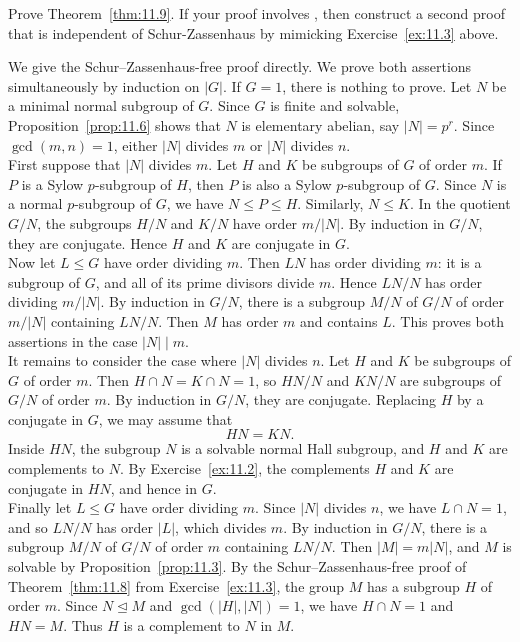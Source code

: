 \documentclass[../Odyssey_Project.tex]{subfiles}
\begin{document}
\begin{exercise}
\label{ex:11.4}
Prove Theorem~\ref{thm:11.9}. If your proof involves , then construct a second proof that is independent of Schur-Zassenhaus by mimicking Exercise~\ref{ex:11.3} above.
\end{exercise}
\begin{solution}
    We give the Schur--Zassenhaus-free proof directly. We prove both assertions simultaneously by induction on $\lvert G\rvert$. If $G=1$, there is nothing to prove. Let $N$ be a minimal normal subgroup of $G$. Since $G$ is finite and solvable, Proposition~\ref{prop:11.6} shows that $N$ is elementary abelian, say $\lvert N\rvert=p^r$. Since $\gcd(m,n)=1$, either $\lvert N\rvert$ divides $m$ or $\lvert N\rvert$ divides $n$.\\
    First suppose that $\lvert N\rvert$ divides $m$. Let $H$ and $K$ be subgroups of $G$ of order $m$. If $P$ is a Sylow $p$-subgroup of $H$, then $P$ is also a Sylow $p$-subgroup of $G$. Since $N$ is a normal $p$-subgroup of $G$, we have $N\leq P\leq H$. Similarly, $N\leq K$. In the quotient $G/N$, the subgroups $H/N$ and $K/N$ have order $m/\lvert N\rvert$. By induction in $G/N$, they are conjugate. Hence $H$ and $K$ are conjugate in $G$.\\
    Now let $L\leq G$ have order dividing $m$. Then $LN$ has order dividing $m$: it is a subgroup of $G$, and all of its prime divisors divide $m$. Hence $LN/N$ has order dividing $m/\lvert N\rvert$. By induction in $G/N$, there is a subgroup $M/N$ of $G/N$ of order $m/\lvert N\rvert$ containing $LN/N$. Then $M$ has order $m$ and contains $L$. This proves both assertions in the case $\lvert N\rvert\mid m$.\\
    It remains to consider the case where $\lvert N\rvert$ divides $n$. Let $H$ and $K$ be subgroups of $G$ of order $m$. Then $H\cap N=K\cap N=1$, so $HN/N$ and $KN/N$ are subgroups of $G/N$ of order $m$. By induction in $G/N$, they are conjugate. Replacing $H$ by a conjugate in $G$, we may assume that
    \[
        HN=KN.
    \]
    Inside $HN$, the subgroup $N$ is a solvable normal Hall subgroup, and $H$ and $K$ are complements to $N$. By Exercise~\ref{ex:11.2}, the complements $H$ and $K$ are conjugate in $HN$, and hence in $G$.\\
    Finally let $L\leq G$ have order dividing $m$. Since $\lvert N\rvert$ divides $n$, we have $L\cap N=1$, and so $LN/N$ has order $\lvert L\rvert$, which divides $m$. By induction in $G/N$, there is a subgroup $M/N$ of $G/N$ of order $m$ containing $LN/N$. Then $\lvert M\rvert=m\lvert N\rvert$, and $M$ is solvable by Proposition~\ref{prop:11.3}. By the Schur--Zassenhaus-free proof of Theorem~\ref{thm:11.8} from Exercise~\ref{ex:11.3}, the group $M$ has a subgroup $H$ of order $m$. Since $N\trianglelefteq M$ and $\gcd(\lvert H\rvert,\lvert N\rvert)=1$, we have $H\cap N=1$ and $HN=M$. Thus $H$ is a complement to $N$ in $M$.\\

\end{solution}
\end{document}
